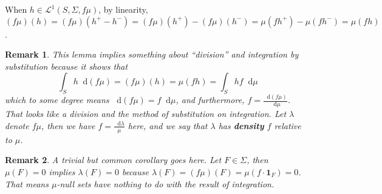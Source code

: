 \documentclass[12pt]{article}
\newcommand*{\dif}{\mathop{}\!\mathrm{d}}
\newcommand{\ind}[1]{\mathbf{1}_{#1}}
\newtheorem{remark}{Remark}
\begin{document}
	When $h\in \mathcal{L}^1(S,\Sigma,f\mu)$, by linearity,  $(f\mu)(h)=(f\mu)(h^+-h^-)=(f\mu)(h^+)-(f\mu)(h^-)=\mu(fh^+)-\mu(fh^-)=\mu(fh)$.
	
	\begin{remark}
		This lemma implies something about ``division'' and integration by substitution because it shows that 
		$$\int_S h \dif{(f\mu)}=(f\mu)(h)=\mu(fh)=\int_Shf\dif\mu$$
		which to some degree means $\dif{(f\mu)}=f\dif\mu$, and furthermore, $f=\frac{\dif{(f\mu)}}{\dif\mu}$. That looks like a division and the method of substitution on integration.
		Let $\lambda$ denote $f\mu$, then we have $f=\frac{\dif{\lambda}}{\mu}$ here, and we say that $\lambda$ has \textbf{density} $f$ relative to $\mu$.
	\end{remark}

	\begin{remark}
		A trivial but common corollary goes here. Let $F\in\Sigma$, then $\mu(F)=0$ implies $\lambda(F)=0$ because $\lambda(F)=(f\mu)(F)=\mu(f\cdot \ind{F})=0$. That means $\mu$-null sets have nothing to do with the result of integration.
	\end{remark}

	
\end{document}

